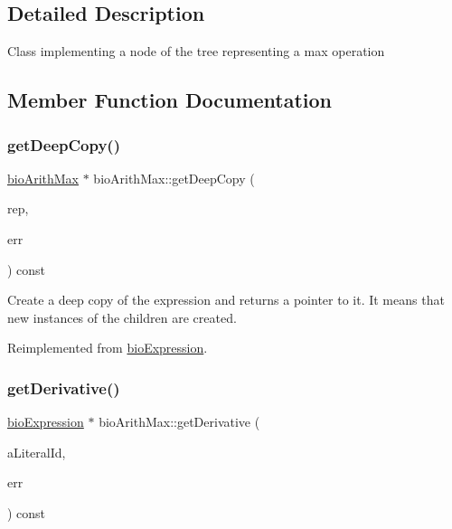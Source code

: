 \subsection{Detailed Description}
Class implementing a node of the tree representing a max operation 

\subsection{Member Function Documentation}
\mbox{\label{classbio_arith_max_a3b2838323b5171114cade7522e6f45dc}} 
\subsubsection{\texorpdfstring{get\+Deep\+Copy()}{getDeepCopy()}}
{\footnotesize\ttfamily \hyperlink{classbio_arith_max}{bio\+Arith\+Max} $\ast$ bio\+Arith\+Max\+::get\+Deep\+Copy (\begin{DoxyParamCaption}\item[{\hyperlink{classbio_expression_repository}{bio\+Expression\+Repository} $\ast$}]{rep,  }\item[{pat\+Error $\ast$\&}]{err }\end{DoxyParamCaption}) const\hspace{0.3cm}{\ttfamily [virtual]}}

Create a deep copy of the expression and returns a pointer to it. It means that new instances of the children are created. 

Reimplemented from \hyperlink{classbio_expression_a4ee1b8add634078a02eaae26cd40dcc8}{bio\+Expression}.

\mbox{\label{classbio_arith_max_a4d6fcb906b3140fb4114e36f7a801d22}} 
\subsubsection{\texorpdfstring{get\+Derivative()}{getDerivative()}}
{\footnotesize\ttfamily \hyperlink{classbio_expression}{bio\+Expression} $\ast$ bio\+Arith\+Max\+::get\+Derivative (\begin{DoxyParamCaption}\item[{pat\+U\+Long}]{a\+Literal\+Id,  }\item[{pat\+Error $\ast$\&}]{err }\end{DoxyParamCaption}) const\hspace{0.3cm}{\ttfamily [virtual]}}

